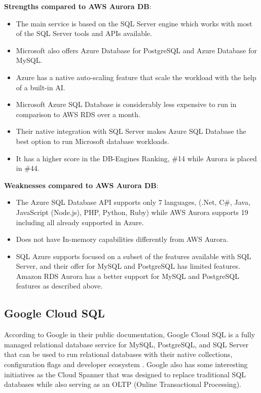 \documentclass{article}
\begin{document}
\textbf{Strengths compared to AWS Aurora DB}:
\begin{itemize}
    \item The main service is based on the SQL Server engine which works with most of the SQL Server tools and APIs available.
    \item Microsoft also offers Azure Database for PostgreSQL and Azure Database for MySQL.
    \item Azure has a native auto-scaling feature that scale the workload with the help of a built-in AI.
    \item Microsoft Azure SQL Database is considerably less expensive to run in comparison to AWS RDS over a month.
    \item Their native integration with SQL Server makes Azure SQL Database the best option to run Microsoft database workloads. 
    \item It has a higher score in the DB-Engines Ranking, \#14 while Aurora is placed in \#44. \cite{dbengineers2021}
        \cite{rdsvsazure2019}
\end{itemize}

\textbf{Weaknesses compared to AWS Aurora DB}:

\begin{itemize}
    \item The  Azure SQL Database API supports only 7 languages, (.Net, C\#, Java, JavaScript (Node.js), PHP, Python, Ruby) while AWS Aurora supports 19 including all already supported in Azure. 
    \item Does not have In-memory capabilities differently from AWS Aurora. \cite{dbengineers2021}
    \item SQL Azure supports focused on a subset of the features available with SQL Server, and their offer for MySQL and PostgreSQL has limited features. Amazon RDS Aurora has a better support for MySQL and PostgreSQL features as described above. 
\end{itemize}

\subsection{Google Cloud SQL}

According to Google in their public documentation, Google Cloud SQL is a fully managed relational database service for MySQL, PostgreSQL, and SQL Server that can be used to run relational databases with their native collections, configuration flags and developer ecosystem \cite{GoogleSql}. Google also has some interesting initiatives as the Cloud Spanner that was designed to replace traditional SQL databases while also serving as an OLTP (Online Transactional Processing).
\end{document}

